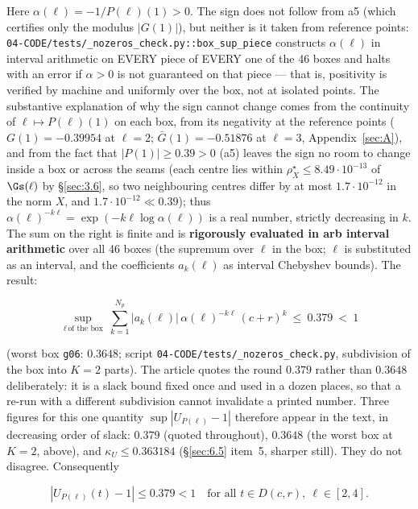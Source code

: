 Here $\alpha(\ell)=-1/P(\ell)(1)>0$. The sign does not follow from a5 (which
certifies only the modulus $|G(1)|$), but neither is it taken from reference
points: \texttt{04-\allowbreak CODE/\allowbreak tests/\allowbreak \_\allowbreak nozeros\_\allowbreak check.py::\allowbreak box\_\allowbreak sup\_\allowbreak piece}
constructs $\alpha(\ell)$ in interval arithmetic on EVERY piece of EVERY one
of the 46 boxes and halts with an error if $\alpha>0$ is not guaranteed on
that piece --- that is, positivity is verified by machine and uniformly over
the box, not at isolated points. The substantive explanation of why the sign
cannot change comes from the continuity of $\ell\mapsto P(\ell)(1)$ on each
box, from its negativity at the reference points ($G(1)=-0.39954$ at
$\ell=2$; $\bar G(1)=-0.51876$ at $\ell=3$, Appendix~\ref{sec:A}), and from the fact
that $|P(1)|\ge0.39>0$ (a5) leaves the sign no room to change inside a box or
across the seams (each centre lies within $\rho^{\star}_{X}\le 8.49\cdot 10^{-13}$
of $\Gs(\ell)$ by \S\ref{sec:3.6}, so two neighbouring centres differ by at
most $1.7\cdot 10^{-12}$ in the norm $X$, and $1.7\cdot 10^{-12}\ll0.39$); thus
$\alpha(\ell)^{-k\ell}=\exp(-k\ell\log\alpha(\ell))$ is a real number,
strictly decreasing in $k$. The sum on the right is finite and is
\textbf{rigorously evaluated in arb interval arithmetic} over all 46 boxes
(the supremum over $\ell$ in the box; $\ell$ is substituted as an interval,
and the coefficients $a_k(\ell)$ as interval Chebyshev bounds). The result:

\[
\sup_{\ell\,\text{of the box}}\ \sum_{k=1}^{N_p}|a_k(\ell)|\,\alpha(\ell)^{-k\ell}\,(c+r)^k
\ \le\ 0.379\ <\ 1
\]

(worst box \texttt{g06}: $0.3648$; script
\texttt{04-\allowbreak CODE/\allowbreak tests/\allowbreak \_\allowbreak nozeros\_\allowbreak check.py}, subdivision of the box into $K=2$
parts). The article quotes the round $0.379$ rather than $0.3648$ deliberately: it is a
slack bound fixed once and used in a dozen places, so that a re-run with a different
subdivision cannot invalidate a printed number. Three figures for this one quantity
$\sup|U_{P(\ell)}-1|$ therefore appear in the text, in decreasing order of slack:
$0.379$ (quoted throughout), $0.3648$ (the worst box at $K=2$, above), and
$\kappa_{U}\le 0.363184$ (\S\ref{sec:6.5} item~5, sharper still). They do not disagree.
Consequently

\begin{equation}
|U_{P(\ell)}(t)-1|\le 0.379<1\quad\text{for all } t\in D(c,r),\ \ell\in[2,4].
\tag{C1}
\end{equation}

